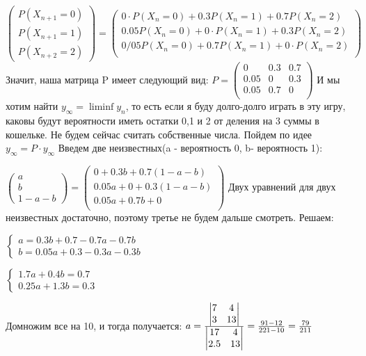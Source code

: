 $\left( \begin{array}{l}
		P(X_{n+1}=0)\\
		P(X_{n+1}=1)\\
		P(X_{n+2}=2)
		\end{array} \right)=
\left( \begin{array}{l}
		0\cdot P(X_n=0)+0.3P(X_n=1)+0.7P(X_n=2)\\
		0.05P(X_n=0)+0\cdot P(X_n=1)+0.3P(X_n=2)\\
		0/05P(X_n=0)+0.7P(X_n=1)+0\cdot P(X_n=2)\\
		\end{array} \right) $
Значит, наша матрица P имеет следующий вид:
$P=\left( \begin{array}{lll}
		0    &0.3 & 0.7\\
		0.05 &0 & 0.3\\
		0.05 &0.7 & 0\\
		\end{array} \right) $
И мы хотим найти $y_\infty=\liminf{y_n}$, то есть если я буду долго-долго играть в эту игру, каковы будут вероятности иметь остатки 0,1 и 2 от деления на 3 суммы в кошельке. Не будем сейчас считать собственные числа. Пойдем по идее $y_\infty=P\cdot y_\infty$
Введем две неизвестных(a - вероятность 0, b- вероятность 1): 

$\left( \begin{array}{l}
		a\\
		b\\
		1-a-b
		\end{array} \right)=
\left( \begin{array}{l}
		0+0.3b+0.7(1-a-b)\\
		0.05a+0+0.3(1-a-b)\\
		0.05a+0.7b+0\\
		\end{array} \right) $
Двух уравнений для двух неизвестных достаточно, поэтому третье не будем дальше смотреть.
Решаем:

$\begin{cases}
a  =  0.3b+0.7-0.7a-0.7b \\
b  =  0.05a+0.3-0.3a-0.3b 
\end{cases}
$

$\begin{cases}
1.7a + 0.4b  =  0.7 \\
0.25a + 1.3b  =  0.3 
\end{cases}$




Домножим все на 10, и тогда получается:
$a=\frac{\begin{vmatrix}
	7 & 4\\
	3 & 13
\end{vmatrix}}
{\begin{vmatrix}
	17 & 4\\
	2.5 & 13
\end{vmatrix}}=\frac{91-12}{221-10}=\frac{79}{211}\\ $

